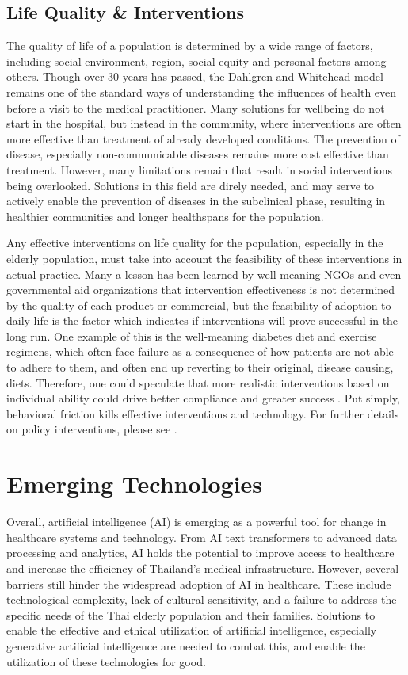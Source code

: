 \documentclass[10pt, a4paper, twocolumn]{article}
\begin{document}
\subsection{Life Quality \& Interventions}
The quality of life of a population is determined by a wide range of factors, including social environment,
region, social equity and personal factors among others. Though over 30 years has passed, the Dahlgren and Whitehead model
remains one of the standard ways of understanding the influences of health even before a visit to the medical practitioner.
Many solutions for wellbeing do not start in the hospital, but instead in the community, where interventions are often more
effective than treatment of already developed conditions. The prevention of disease, especially non-communicable diseases
remains more cost effective than treatment. However, many limitations remain that result in social interventions being overlooked.
Solutions in this field are direly needed, and may serve to actively enable the prevention of diseases in the subclinical phase,
resulting in healthier communities and longer healthspans for the population.

Any effective interventions on life quality for the population, especially in the elderly population, must take into account
the feasibility of these interventions in actual practice. Many a lesson has been learned by well-meaning NGOs and even
governmental aid organizations that intervention effectiveness is not determined by the quality of each product or commercial,
but the feasibility of adoption to daily life is the factor which indicates if interventions will prove successful in the long run.
One example of this is the well-meaning diabetes diet and exercise regimens, which often face failure as a consequence of how
patients are not able to adhere to them, and often end up reverting to their original, disease causing, diets. Therefore,
one could speculate that more realistic interventions based on individual ability could drive better compliance and
greater success \cite{samiEffectDietType2017}. Put simply, behavioral friction kills effective interventions and
technology. For further details on policy interventions, please see \citet{weaverWillItWork}.
\section{Emerging Technologies}
Overall, artificial intelligence (AI) is emerging as a powerful tool for change in healthcare systems and technology.
From AI text transformers to advanced data processing and analytics, AI holds the potential to improve access to healthcare
and increase the efficiency of Thailand’s medical infrastructure. However, several barriers still hinder the widespread adoption
of AI in healthcare. These include technological complexity, lack of cultural sensitivity, and a failure to address the specific
needs of the Thai elderly population and their families. Solutions to enable the effective and ethical utilization of
artificial intelligence, especially generative artificial intelligence are needed to combat this, and enable the
utilization of these technologies for good.
\end{document}
